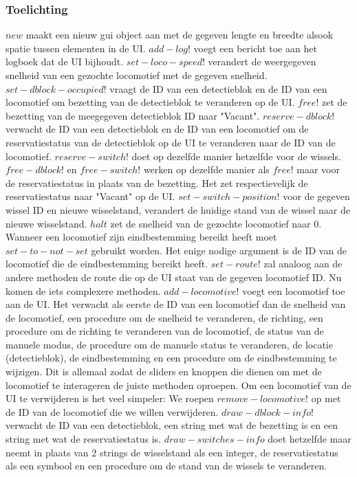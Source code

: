 \documentclass{article}
\begin{document}
\subsubsection{Toelichting}
$new$ maakt een nieuw gui object aan met de gegeven lengte en breedte alsook spatie tussen elementen in de UI. $add-log!$ voegt een bericht toe aan het logboek dat 
de UI bijhoudt. $set-loco-speed!$ verandert de weergegeven snelheid van een gezochte locomotief met de gegeven snelheid. 
$set-dblock-occupied!$ vraagt de ID van een detectieblok en de ID van een locomotief om bezetting van de detectieblok te veranderen op de UI.
$free!$ zet de bezetting van de meegegeven detectieblok ID naar "Vacant". $reserve-dblock!$ verwacht de ID van een detectieblok en de ID van een locomotief om 
de reservatiestatus van de detectieblok op de UI te veranderen naar de ID van de locomotief. $reserve-switch!$ doet op dezelfde manier hetzelfde voor de wissels. $free-dblock!$ en $free-switch!$ werken op dezelfde
manier als $free!$ maar voor de reservatiestatus in plaats van de bezetting. Het zet respectievelijk de reservatiestatus naar "Vacant" op de UI.
$set-switch-position!$ voor de gegeven wissel ID en nieuwe wisselstand, verandert de huidige stand van de wissel naar de nieuwe wisselstand. 
$halt$ zet de snelheid van de gezochte locomotief naar 0. Wanneer een locomotief zijn eindbestemming bereikt heeft moet $set-to-not-set$ gebruikt worden. Het enige 
nodige argument is de ID van de locomotief die de eindbestemming bereikt heeft. 
$set-route!$ zal analoog aan de andere methoden de route die op de UI staat van de gegeven locomotief ID. Nu komen de iets
complexere methoden. $add-locomotive!$ voegt een locomotief toe aan de UI. Het verwacht als eerste
de ID van een locomotief dan de snelheid van de locomotief, een procedure om de snelheid te veranderen, de richting, 
een procedure om de richting te veranderen van de locomotief, de status van de manuele modus, de procedure om de manuele status te veranderen, de locatie (detectieblok), de eindbestemming en een procedure om de eindbestemming te wijzigen. 
Dit is allemaal zodat de sliders en knoppen die dienen om met de locomotief te interageren de juiste methoden oproepen. 
Om een locomotief van de UI te verwijderen is het veel simpeler: We roepen $remove-locomotive!$ op met de ID van de locomotief
die we willen verwijderen. $draw-dblock-info!$ verwacht de ID van een detectieblok, een string met wat de bezetting is en een string met wat de reservatiestatus is. 
$draw-switches-info$ doet hetzelfde maar neemt in plaats van 2 strings de wisselstand als een integer, de reservatiestatus als een symbool en een procedure om de stand van de wissels te veranderen.
\end{document}
